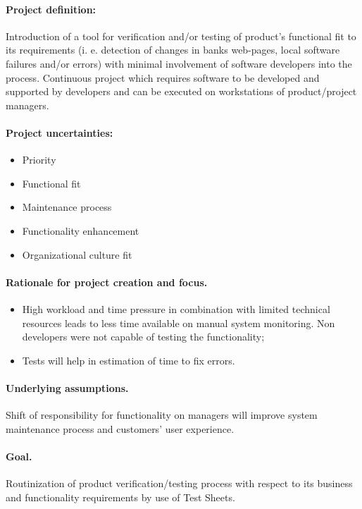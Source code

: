 \paragraph{Project definition:} Introduction of a tool for verification and/or testing of product’s functional fit to its requirements (i. e. detection of changes in banks web-pages, local software failures and/or errors) with minimal involvement of software developers into the process. Continuous project which requires software to be developed and supported by developers and can be executed on workstations of product/project managers.

\paragraph{Project uncertainties:}
\begin{itemize}
	\item Priority
	\item Functional fit
	\item Maintenance process
	\item Functionality enhancement
	\item Organizational culture fit
\end{itemize}

\paragraph{Rationale for project creation and focus.} 
\begin{itemize}
	\item High workload and time pressure in combination with limited technical resources leads to less time available on manual system monitoring. Non developers were not capable of testing the functionality;
	\item Tests will help in estimation of time to fix errors.
\end{itemize}


\paragraph{Underlying assumptions.} Shift of responsibility for functionality  on managers will improve system maintenance process and customers' user experience. 

\paragraph{Goal.} Routinization of product verification/testing process with respect to its business and functionality requirements by use of Test Sheets.
